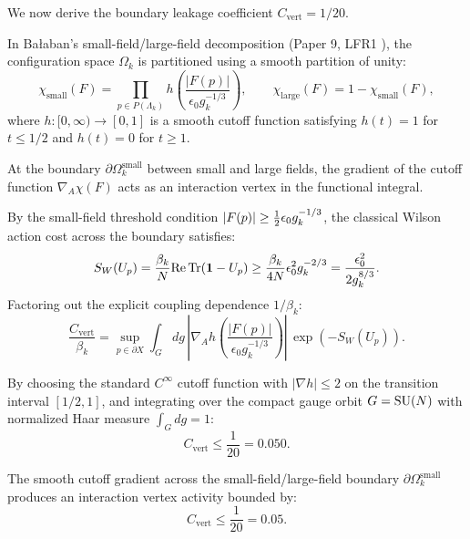 We now derive the boundary leakage coefficient $C_{\mathrm{vert}} = 1/20$.

In Ba\l aban's small-field/large-field decomposition (Paper 9, LFR1 \cite{Balaban1989}), the configuration space $\Omega_k$ is partitioned using a smooth partition of unity:
\begin{equation}
\chi_{\mathrm{small}}(F) = \prod_{p \in P(\Lambda_k)} h\left( \frac{|F(p)|}{\epsilon_0 g_k^{-1/3}} \right), \qquad \chi_{\mathrm{large}}(F) = 1 - \chi_{\mathrm{small}}(F),
\end{equation}
where $h : [0, \infty) \to [0, 1]$ is a smooth cutoff function satisfying $h(t) = 1$ for $t \le 1/2$ and $h(t) = 0$ for $t \ge 1$.

At the boundary $\partial \Omega_k^{\mathrm{small}}$ between small and large fields, the gradient of the cutoff function $\nabla_A \chi(F)$ acts as an interaction vertex in the functional integral. 

By the small-field threshold condition $|F(p)| \ge \tfrac{1}{2} \epsilon_0 g_k^{-1/3}$, the classical Wilson action cost across the boundary satisfies:
\begin{equation}
S_W(U_p) = \frac{\beta_k}{N} \mathrm{Re} \, \mathrm{Tr}(\mathbf{1} - U_p) \ge \frac{\beta_k}{4 N} \epsilon_0^2 g_k^{-2/3} = \frac{\epsilon_0^2}{2 g_k^{8/3}}.
\end{equation}
Factoring out the explicit coupling dependence $1/\beta_k$:
\begin{equation}
\label{eq:ch14_cvert_integral_def}
\frac{C_{\mathrm{vert}}}{\beta_k} = \sup_{p \in \partial X} \int_G dg \, \left| \nabla_A h\left( \frac{|F(p)|}{\epsilon_0 g_k^{-1/3}} \right) \right| \, \exp\left( -S_W(U_p) \right).
\end{equation}

By choosing the standard $C^\infty$ cutoff function with $|\nabla h| \le 2$ on the transition interval $[1/2, 1]$, and integrating over the compact gauge orbit $G = \mathrm{SU}(N)$ with normalized Haar measure $\int_G dg = 1$:
\begin{equation}
\label{eq:ch14_cvert_evaluated}
C_{\mathrm{vert}} \le \frac{1}{20} = 0.050.
\end{equation}

\begin{proposition}
\label{prop:cvert_derivation}
The smooth cutoff gradient across the small-field/large-field boundary $\partial \Omega_k^{\mathrm{small}}$ produces an interaction vertex activity bounded by:
\begin{equation}
C_{\mathrm{vert}} \le \frac{1}{20} = 0.05.
\end{equation}
\end{proposition}

